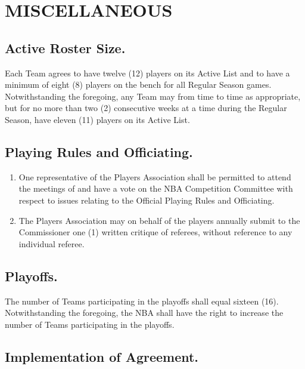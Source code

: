 \documentclass[
]{book}
\providecommand{\tightlist}{%
  \setlength{\itemsep}{0pt}\setlength{\parskip}{0pt}}
\begin{document}
\hypertarget{miscellaneous}{%
\chapter{MISCELLANEOUS}\label{miscellaneous}}

\hypertarget{active-roster-size.}{%
\section{Active Roster Size.}\label{active-roster-size.}}

Each Team agrees to have twelve (12) players on its Active List and to have a minimum of eight (8) players on the bench for all Regular Season games. Notwithstanding the foregoing, any Team may from time to time as appropriate, but for no more than two (2) consecutive weeks at a time during the Regular Season, have eleven (11) players on its Active List.

\hypertarget{playing-rules-and-officiating.}{%
\section{Playing Rules and Officiating.}\label{playing-rules-and-officiating.}}

\begin{enumerate}
\def\labelenumi{(\alph{enumi})}
\tightlist
\item
  One representative of the Players Association shall be permitted to attend the meetings of and have a vote on the NBA Competition Committee with respect to issues relating to the Official Playing Rules and Officiating.
\item
  The Players Association may on behalf of the players annually submit to the Commissioner one (1) written critique of referees, without reference to any individual referee.
\end{enumerate}

\hypertarget{playoffs.}{%
\section{Playoffs.}\label{playoffs.}}

The number of Teams participating in the playoffs shall equal sixteen (16). Notwithstanding the foregoing, the NBA shall have the right to increase the number of Teams participating in the playoffs.

\hypertarget{implementation-of-agreement.}{%
\section{Implementation of Agreement.}\label{implementation-of-agreement.}}
\end{document}
